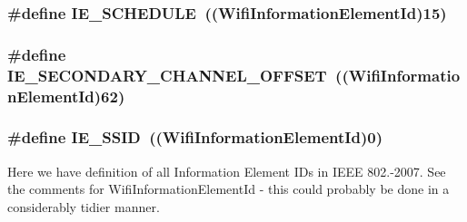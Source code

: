 \subsubsection[{\texorpdfstring{I\+E\+\_\+\+S\+C\+H\+E\+D\+U\+LE}{IE_SCHEDULE}}]{\setlength{\rightskip}{0pt plus 5cm}\#define I\+E\+\_\+\+S\+C\+H\+E\+D\+U\+LE~((Wifi\+Information\+Element\+Id)15)}\hypertarget{wifi-information-element_8h_a078440ff09963a3417818302ee55e8b8}{}\label{wifi-information-element_8h_a078440ff09963a3417818302ee55e8b8}
\subsubsection[{\texorpdfstring{I\+E\+\_\+\+S\+E\+C\+O\+N\+D\+A\+R\+Y\+\_\+\+C\+H\+A\+N\+N\+E\+L\+\_\+\+O\+F\+F\+S\+ET}{IE_SECONDARY_CHANNEL_OFFSET}}]{\setlength{\rightskip}{0pt plus 5cm}\#define I\+E\+\_\+\+S\+E\+C\+O\+N\+D\+A\+R\+Y\+\_\+\+C\+H\+A\+N\+N\+E\+L\+\_\+\+O\+F\+F\+S\+ET~((Wifi\+Information\+Element\+Id)62)}\hypertarget{wifi-information-element_8h_a39cfc8b3ed6ca106554a7a395ca7b12a}{}\label{wifi-information-element_8h_a39cfc8b3ed6ca106554a7a395ca7b12a}
\subsubsection[{\texorpdfstring{I\+E\+\_\+\+S\+S\+ID}{IE_SSID}}]{\setlength{\rightskip}{0pt plus 5cm}\#define I\+E\+\_\+\+S\+S\+ID~((Wifi\+Information\+Element\+Id)0)}\hypertarget{wifi-information-element_8h_af85d627768f6e8129975b0dd86caed04}{}\label{wifi-information-element_8h_af85d627768f6e8129975b0dd86caed04}
Here we have definition of all Information Element I\+Ds in I\+E\+EE 802.-\/2007. See the comments for Wifi\+Information\+Element\+Id -\/ this could probably be done in a considerably tidier manner. 

